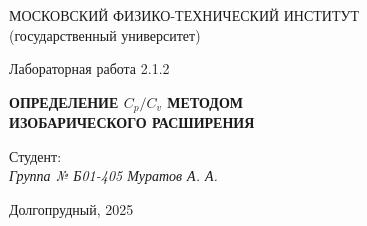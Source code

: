\thispagestyle{empty}

\begin{center}
    МОСКОВСКИЙ ФИЗИКО-ТЕХНИЧЕСКИЙ ИНСТИТУТ \\
    (государственный университет)
\end{center}

\vfill

\begin{center}
    Лабораторная работа 2.1.2 \\ 
    \vspace{20pt}
    
    \textbf{ОПРЕДЕЛЕНИЕ $C_p/C_v$ МЕТОДОМ} \\
    \textbf{ИЗОБАРИЧЕСКОГО РАСШИРЕНИЯ}
\end{center}  

\vfill

    \noindent Студент: \\
    \textit{Группа № Б01-405 \hfill Муратов А. А.}

\vfill

\begin{center}
    Долгопрудный, 2025
\end{center}